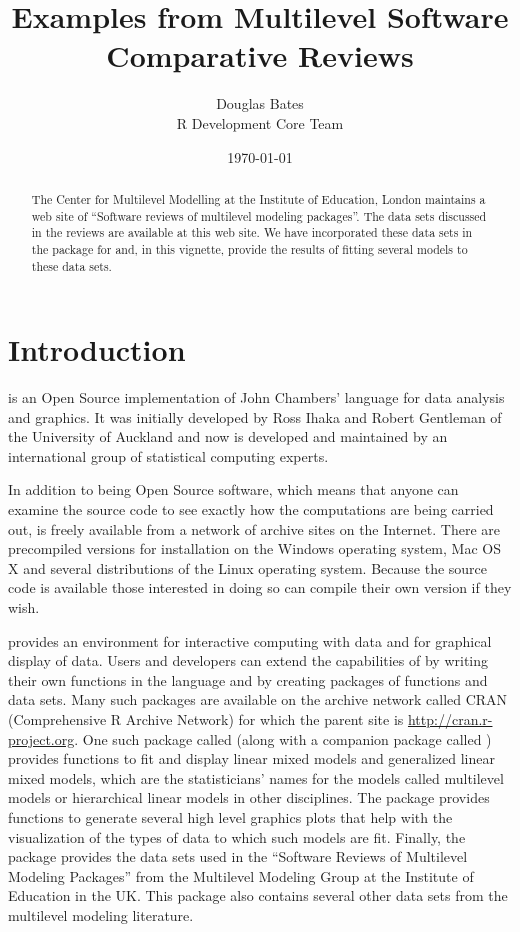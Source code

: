 \documentclass[12pt]{article}
\begin{document}
\title{Examples from Multilevel Software Comparative Reviews}
\author{Douglas Bates\\R Development Core Team\\}
\date{\today}
\maketitle
\begin{abstract}
   The Center for Multilevel Modelling at the Institute of Education,
   London maintains a web site of ``Software reviews of multilevel
   modeling packages''.  The data sets discussed in the reviews are
   available at this web site.  We have incorporated these data sets
   in the  package for \RR{} and, in this vignette, provide
   the results of fitting several models to these data sets.
\end{abstract}

\section{Introduction}
\label{sec:Intro}

\RR{} is an Open Source implementation of John Chambers' \Slang{}
language for data analysis and graphics.  It was initially developed
by Ross Ihaka and Robert Gentleman of the University of Auckland and
now is developed and maintained by an international group of
statistical computing experts.

In addition to being Open Source software, which means that anyone can
examine the source code to see exactly how the computations are being
carried out, \RR{} is freely available from a network of archive sites
on the Internet.  There are precompiled versions for installation on
the Windows operating system, Mac OS X and several distributions of
the Linux operating system.  Because the source code is available
those interested in doing so can compile their own version if they wish.

\RR{} provides an environment for interactive computing with data and for
graphical display of data.  Users and developers can extend the
capabilities of \RR{} by writing their own functions in the language
and by creating packages of functions and data sets.  Many such
packages are available on the archive network called CRAN
(Comprehensive R Archive Network) for which the parent site is
\url{http://cran.r-project.org}. One such package called 
(along with a companion package called ) provides
functions to fit and display linear mixed models and generalized
linear mixed models, which are the statisticians' names for the models
called multilevel models or hierarchical linear models in other
disciplines.  The  package provides functions to
generate several high level graphics plots that help with the
visualization of the types of data to which such models are fit.
Finally, the  package provides the data sets used in the
``Software Reviews of Multilevel Modeling Packages'' from the
Multilevel Modeling Group at the Institute of Education in the UK.
This package also contains several other data sets from the multilevel
modeling literature.
\end{document}
